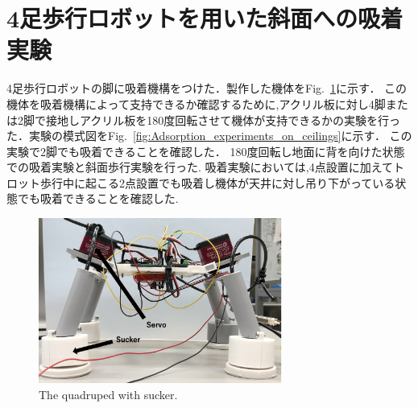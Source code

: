 \documentclass[uplatex,dvipdfmx]{jlreq}
\begin{document}
\section{4足歩行ロボットを用いた斜面への吸着実験}
4足歩行ロボットの脚に吸着機構をつけた．製作した機体をFig.~\ref{fig:The_quadruped_with_sucker.}に示す．
この機体を吸着機構によって支持できるか確認するために,アクリル板に対し4脚または2脚で接地しアクリル板を180度回転させて機体が支持できるかの実験を行った．実験の模式図をFig.~\ref{fig:Adsorption_experiments_on_ceilings}に示す．
この実験で2脚でも吸着できることを確認した．
180度回転し地面に背を向けた状態での吸着実験と斜面歩行実験を行った.
吸着実験においては,4点設置に加えてトロット歩行中に起こる2点設置でも吸着し機体が天井に対し吊り下がっている状態でも吸着できることを確認した.

\begin{figure}
    \centering
    \includegraphics[width=80mm]{./figure/quadruped.png}
    \caption{The quadruped with sucker.}
    \label{fig:The_quadruped_with_sucker.}
\end{figure}
\end{document}
